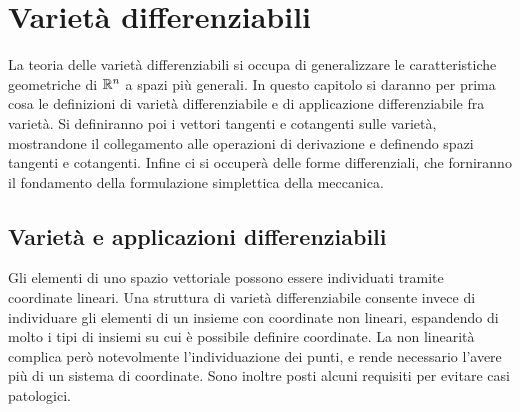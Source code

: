 \chapter{Varietà differenziabili}

La teoria delle varietà differenziabili si occupa di generalizzare le caratteristiche geometriche di $\mathbb{R}^n$ a spazi più generali. In questo capitolo si daranno per prima cosa le definizioni di varietà differenziabile e di applicazione differenziabile fra varietà. Si definiranno poi i vettori tangenti e cotangenti sulle varietà, mostrandone il collegamento alle operazioni di derivazione e definendo spazi tangenti e cotangenti. Infine ci si occuperà delle forme differenziali, che forniranno il fondamento della formulazione simplettica della meccanica.
\section{Varietà e applicazioni differenziabili} \label{sec:smoothMfd}
Gli elementi di uno spazio vettoriale possono essere individuati tramite coordinate lineari. Una struttura di varietà differenziabile consente invece di individuare gli elementi di un insieme con coordinate non lineari, espandendo di molto i tipi di insiemi su cui è possibile definire coordinate. La non linearità complica però notevolmente l'individuazione dei punti, e rende necessario l'avere più di un sistema di coordinate. Sono inoltre posti alcuni requisiti per evitare casi patologici.

